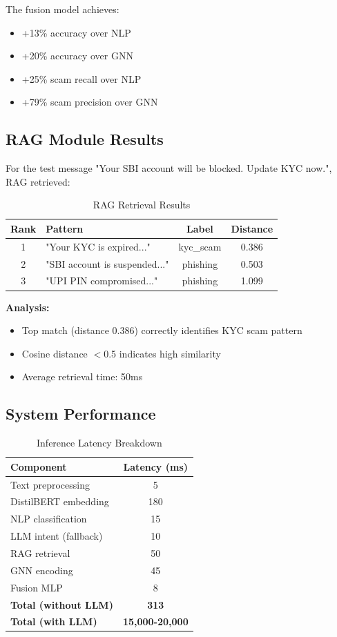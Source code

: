 The fusion model achieves:
\begin{itemize}
    \item +13\% accuracy over NLP
    \item +20\% accuracy over GNN
    \item +25\% scam recall over NLP
    \item +79\% scam precision over GNN
\end{itemize}

\subsection{RAG Module Results}

For the test message "Your SBI account will be blocked. Update KYC now.", RAG retrieved:

\begin{table}[h]
\centering
\caption{RAG Retrieval Results}
\label{tab:rag_results}
\begin{tabular}{clcc}
\toprule
\textbf{Rank} & \textbf{Pattern} & \textbf{Label} & \textbf{Distance} \\
\midrule
1 & "Your KYC is expired..." & kyc\_scam & 0.386 \\
2 & "SBI account is suspended..." & phishing & 0.503 \\
3 & "UPI PIN compromised..." & phishing & 1.099 \\
\bottomrule
\end{tabular}
\end{table}

\textbf{Analysis:}
\begin{itemize}
    \item Top match (distance 0.386) correctly identifies KYC scam pattern
    \item Cosine distance $<$0.5 indicates high similarity
    \item Average retrieval time: 50ms
\end{itemize}

\subsection{System Performance}

\begin{table}[h]
\centering
\caption{Inference Latency Breakdown}
\label{tab:latency}
\begin{tabular}{lc}
\toprule
\textbf{Component} & \textbf{Latency (ms)} \\
\midrule
Text preprocessing & 5 \\
DistilBERT embedding & 180 \\
NLP classification & 15 \\
LLM intent (fallback) & 10 \\
RAG retrieval & 50 \\
GNN encoding & 45 \\
Fusion MLP & 8 \\
\midrule
\textbf{Total (without LLM)} & \textbf{313} \\
\textbf{Total (with LLM)} & \textbf{15,000-20,000} \\
\bottomrule
\end{tabular}
\end{table}

